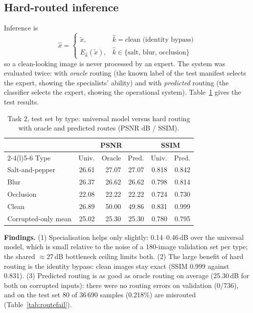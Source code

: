 \documentclass[conference]{IEEEtran}
\begin{document}
\subsection{Hard-routed inference}
Inference is
\begin{equation}
\hat x=\begin{cases}\tilde x, & \hat k=\text{clean (identity bypass)}\\ E_{\hat k}(\tilde x), & \hat k\in\{\text{salt, blur, occlusion}\}\end{cases}
\end{equation}
so a clean-looking image is never processed by an expert. The system was evaluated twice: with \emph{oracle} routing (the known label of the test manifest selects the expert, showing the specialists' ability) and with \emph{predicted} routing (the classifier selects the expert, showing the operational system). Table~\ref{tab:t2type} gives the test results.

\begin{table}[t]
\caption{Task 2, test set by type: universal model versus hard routing with oracle and predicted routes (PSNR dB / SSIM).}
\label{tab:t2type}
\centering\footnotesize
\setlength{\tabcolsep}{4pt}
\begin{tabular}{@{}lrrrrr@{}}
\toprule
 & \multicolumn{3}{c}{PSNR} & \multicolumn{2}{c}{SSIM}\\
\cmidrule(lr){2-4}\cmidrule(l){5-6}
Type & Univ. & Oracle & Pred. & Univ. & Pred.\\
\midrule
Salt-and-pepper & 26.61 & 27.07 & 27.07 & 0.818 & 0.842\\
Blur & 26.37 & 26.62 & 26.62 & 0.798 & 0.814\\
Occlusion & 22.08 & 22.22 & 22.22 & 0.724 & 0.730\\
Clean & 26.89 & 50.00 & 49.86 & 0.831 & 0.999\\
\midrule
Corrupted-only mean & 25.02 & 25.30 & 25.30 & 0.780 & 0.795\\
\bottomrule
\end{tabular}
\end{table}

\textbf{Findings.} (1) Specialisation helps only slightly: 0.14--0.46\,dB over the universal model, which is small relative to the noise of a 180-image validation set per type; the shared $\approx$27\,dB bottleneck ceiling limits both. (2) The large benefit of hard routing is the identity bypass: clean images stay exact (SSIM 0.999 against 0.831). (3) Predicted routing is as good as oracle routing on average (25.30\,dB for both on corrupted inputs): there were no routing errors on validation (0/736), and on the test set 80 of 36\,690 samples (0.218\%) are misrouted (Table~\ref{tab:routefail}).
\end{document}

